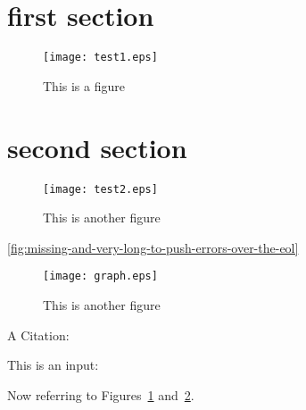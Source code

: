 \documentclass[
    letterpaper %
]{article}
\begin{document}
\tableofcontents
\listoffigures

\section{first section}

\nocite{testentry3}

\begin{figure}
\centering
    \texttt{[image: test1.eps]}
\caption{This is a figure}
\label{fig:test1}
\end{figure}

\section{second section}

\begin{figure}
\centering
    \texttt{[image: test2.eps]}
\caption{This is another figure}
\label{fig:test2}
\end{figure}

\ref{fig:missing-and-very-long-to-push-errors-over-the-eol}

\begin{figure}
\centering
    \texttt{[image: graph.eps]}
\caption{This is another figure}
\label{fig:test3}
\end{figure}

A Citation: \cite{testentry}

This is an input: {}




Now referring to Figures~\ref{fig:test1} and~\ref{fig:test2}.
\end{document}
